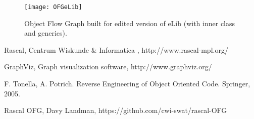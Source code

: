 \documentclass[a4paper,11pt]{article}
\begin{document}
		\begin{figure}[h!]
			\centering
			\texttt{[image: OFGeLib]}
			\caption{Object Flow Graph built for edited version of eLib (with inner class and generics).}
			\label{fig:ofgelib}
		\end{figure}

	\begin{thebibliography}{9}
			Rascal, Centrum Wiskunde \& Informatica , http://www.rascal-mpl.org/

			GraphViz, Graph visualization software, http://www.graphviz.org/

			F. Tonella, A. Potrich. 
			Reverse Engineering of Object Oriented Code.
			Springer,
			2005.
			
			Rascal OFG, Davy Landman, https://github.com/cwi-swat/rascal-OFG
		
	\end{thebibliography}
\end{document}
